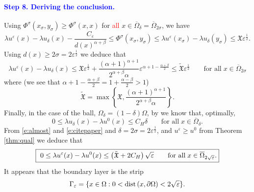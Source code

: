 \documentclass[11pt,reqno]{amsart}
\numberwithin{figure}{section}
\theoremstyle{plain}
\theoremstyle{remark}
\numberwithin{equation}{section}
\newcommand{\dist}{{\rm dist}\,}
\begin{document}
\paragraph{\textcolor{blue}{\textbf{Step 8. Deriving the conclusion}.}} Using $\Phi^\sigma(x_\sigma,y_\sigma)\geq \Phi^\sigma(x,x)$ for \textcolor{red}{all} $x\in \overline{\Omega}_\delta =  \overline{\Omega}_{2\sigma}$, we have
\begin{equation*}
    \lambda u^\varepsilon(x) - \lambda u_\delta(x) - \frac{C_\varepsilon}{d(x)^{\alpha+\beta}} \leq \Phi^\sigma(x_\sigma,y_\sigma) \leq \lambda u^\varepsilon(x_\sigma) - \lambda u_\delta(y_\sigma) \leq \mathfrak{X}\varepsilon^\frac{1}{2}.
\end{equation*}
Using $d(x)\geq 2\sigma = 2\varepsilon^{\frac{1}{2}}$ we deduce that
\begin{equation}\label{e:almost}
    \lambda u^\varepsilon(x) - \lambda u_\delta(x) \leq \mathfrak{X}\varepsilon^\frac{1}{2} + \frac{(\alpha+1)^{\alpha+1}}{2^{\alpha+\beta}\alpha}\varepsilon^{\alpha+1 - \frac{\alpha+\beta}{2}} \leq \tilde{\mathfrak{X}}\varepsilon^\frac{1}{2} \qquad \text{for all}\;x\in \overline{\Omega}_{2\sigma}
\end{equation}
where (we see that $\alpha+1 - \frac{\alpha+\beta}{2} = 1+ \frac{\alpha-\beta}{2} > 1$)
\begin{equation*}
    \tilde{\mathfrak{X}} = \max \left\lbrace\mathfrak{X}, \frac{(\alpha+1)^{\alpha+1}}{2^{\alpha+\beta}\alpha} \right\rbrace.
\end{equation*}
Finally, in the case of the ball, $\Omega_\delta = (1-\delta)\Omega$, by \cite[Theorem 1.5]{kim_state-constraint_2020} we know that, optimally,
\begin{equation}\label{e:citepaper}
    0\leq \lambda u_\delta(x) - \lambda u^0(x)\leq C_H\delta \qquad\text{for all}\; x\in \overline{\Omega}_\delta.
\end{equation}
From \eqref{e:almost} and \eqref{e:citepaper} and $\delta =2\sigma= 2\varepsilon^\frac{1}{2}$, and $u^\varepsilon \geq u^0$ from Theorem \ref{thm:qual} we deduce that
\begin{align*}
    \fbox{ $\displaystyle 0 \leq \lambda u^\varepsilon(x) - \lambda u^0(x) \leq \left(\tilde{\mathfrak{X}} + 2C_H\right)\sqrt{\varepsilon} \qquad\text{for all}\; x\in \overline{\Omega}_{2\sqrt{\varepsilon}}$.}
\end{align*}
It appears that the boundary layer is the strip
\begin{equation*}
    \Gamma_\varepsilon = \{x\in \Omega: 0<\mathrm\dist(x,\partial\Omega)< 2\sqrt{\varepsilon}\}.
\end{equation*}
\end{document}
